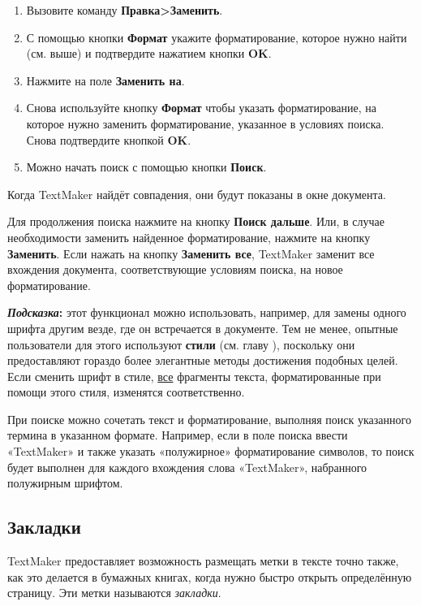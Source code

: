 ﻿\documentclass[a4paper,10pt]{article}
\begin{document}
\begin{enumerate}
 \item Вызовите команду \textbf{Правка>Заменить}.
 \item С помощью кнопки \textbf{Формат} укажите форматирование, которое нужно найти (см. выше) и подтвердите нажатием кнопки \textbf{OK}.
 \item Нажмите на поле \textbf{Заменить на}.
 \item Снова используйте кнопку \textbf{Формат} чтобы указать форматирование, на которое нужно заменить форматирование, указанное в условиях поиска. Снова подтвердите кнопкой \textbf{OK}.
 \item Можно начать поиск с  помощью кнопки \textbf{Поиск}.
\end{enumerate}

Когда TextMaker найдёт совпадения, они будут показаны в окне документа.

Для продолжения поиска нажмите на кнопку \textbf{Поиск дальше}. Или, в случае необходимости заменить найденное форматирование, нажмите на кнопку \textbf{Заменить}. Если нажать на кнопку \textbf{Заменить все}, TextMaker заменит все вхождения документа, соответствующие условиям поиска, на новое форматирование.

\begin{mdframed}[backgroundcolor=blue!10]
\textbf{\textit{Подсказка}:} этот функционал можно использовать, например, для замены одного шрифта другим везде, где он встречается в документе. Тем не менее, опытные пользователи для этого используют \textbf{стили} (см. главу ), поскольку они предоставляют гораздо более элегантные методы достижения подобных целей. Если сменить шрифт в стиле, \underline{все} фрагменты текста, форматированные при помощи этого стиля, изменятся соответственно.
\end{mdframed}

При поиске можно сочетать текст и форматирование, выполняя поиск указанного термина в указанном формате. Например, если в поле поиска ввести «TextMaker» и также указать «полужирное» форматирование символов, то поиск будет выполнен для каждого вхождения слова «TextMaker», набранного полужирным шрифтом.

\subsection{Закладки}
TextMaker предоставляет возможность размещать метки в тексте точно также, как это делается в бумажных книгах, когда нужно быстро открыть определённую страницу. Эти метки называются \textit{закладки}.
\end{document}
